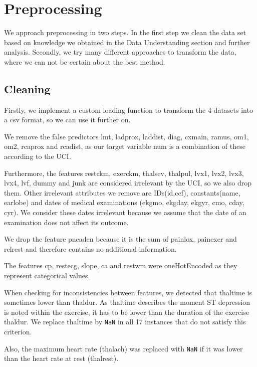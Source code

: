 \newpage
\section{Preprocessing}
We approach preprocessing in two steps. In the first step we clean the data set based on knowledge we obtained in the Data Understanding section and further analysis. 
Secondly, we try many different approaches to transform the data, where we can not be certain about the best method. 

\subsection{Cleaning}
Firstly, we implement a custom loading function to transform the 4 datasets into a csv format, so we can use it further on.

We remove the false predictors lmt, ladprox, laddist, diag, cxmain, ramus, om1, om2, rcaprox and rcadist, as our target variable num is a combination of these according to the UCI. %

Furthermore, the features restckm, exerckm, thalsev, thalpul, lvx1, lvx2, lvx3, lvx4, lvf, dummy and junk are considered irrelevant by the UCI, so we also drop them. Other irrelevant attributes we remove are IDs(id,ccf), constants(name, earlobe) and dates of medical examinations (ekgmo, ekgday, ekgyr, cmo, cday, cyr). We consider these dates irrelevant because we assume that the date of  an examination does not affect its outcome. 

We drop the feature pncaden because it is the sum of painlox, painexer and relrest and therefore contains no additional information. 

The features cp, restecg, slope, ca and restwm were oneHotEncoded as they represent categorical values.

When checking for inconsistencies between features, we detected that thaltime is sometimes lower than thaldur. As thaltime describes the moment ST depression is noted within the exercise, it has to be lower than the duration of the exercise thaldur. We replace thaltime by \texttt{NaN} in all 17 instances that do not satisfy this criterion. 

Also, the maximum heart rate (thalach) was replaced with \texttt{NaN} if it was lower than the heart rate at rest (thalrest).

